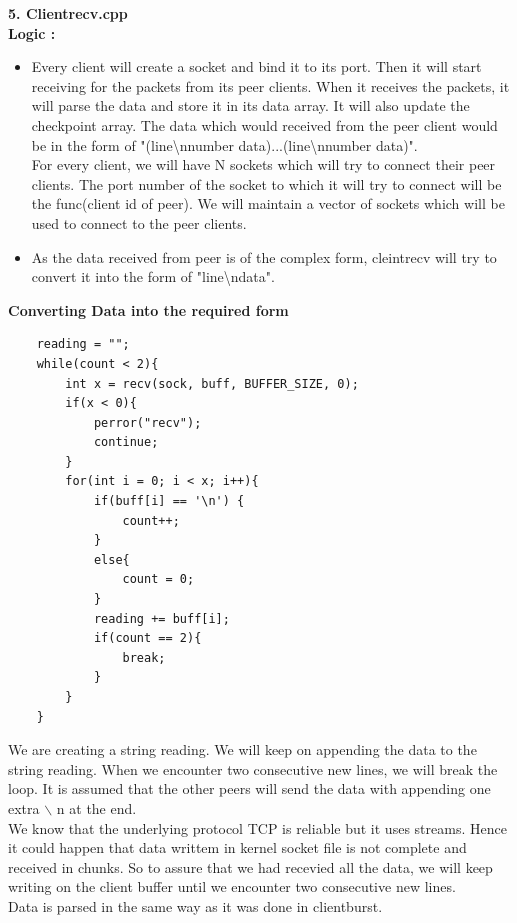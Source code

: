 \documentclass[12pt]{scrartcl}
\begin{document}
\textbf{5. Clientrecv.cpp}\\
\hspace*{28px}\textbf{Logic : }
\begin{itemize}
    \item Every client will create a socket and bind it to its port. Then it will start receiving for the packets from its peer clients. When it receives the packets, it will parse the data and store it in its data array. It will also update the checkpoint array. The data which would received from the peer client would be in the form of "(line\textbackslash nnumber data)...(line\textbackslash nnumber data)".\\ For every client, we will have N sockets which will try to connect their peer clients. The port number of the socket to which it will try to connect will be the func(client id of peer). We will maintain a vector of sockets which will be used to connect to the peer clients.
    \item As the data received from peer is of the complex form, cleintrecv will try to convert it into the form of "line\textbackslash ndata".
\end{itemize}
\textbf{Converting Data into the required form}
\begin{verbatim}
    reading = "";
    while(count < 2){
        int x = recv(sock, buff, BUFFER_SIZE, 0);
        if(x < 0){
            perror("recv");
            continue;
        }
        for(int i = 0; i < x; i++){
            if(buff[i] == '\n') {
                count++;
            }
            else{
                count = 0;
            }
            reading += buff[i];
            if(count == 2){
                break;
            }
        }
    }
\end{verbatim}
\par We are creating a string reading. We will keep on appending the data to the string reading. When we encounter two consecutive new lines, we will break the loop. It is assumed that the other peers will send the data with appending one extra $\backslash$ n at the end.\\
We know that the underlying protocol TCP is reliable but it uses streams. Hence it could happen that data writtem in kernel socket file is not complete and received in chunks. So to assure that we had recevied all the data, we will keep writing on the client buffer until we encounter two consecutive new lines.\\
Data is parsed in the same way as it was done in clientburst.\\
\end{document}
